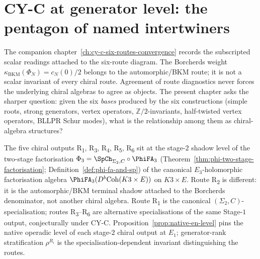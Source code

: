 \chapter{CY-C at generator level: the pentagon of named intertwiners}
\label{ch:cy-c-six-routes-generator-level}

\providecommand{\CoHA}{\mathrm{CoHA}}
\providecommand{\Coh}{\mathrm{Coh}}
\providecommand{\HH}{\mathrm{HH}}
\providecommand{\Sym}{\mathrm{Sym}}
\providecommand{\Hilb}{\mathrm{Hilb}}
\providecommand{\Eone}{E_{1}}
\providecommand{\gbkm}{\mathfrak{g}_{\Delta_5}}
\providecommand{\kch}{\kappa_{\mathrm{ch}}}
\providecommand{\kcat}{\kappa_{\mathrm{cat}}}
\providecommand{\kbkm}{\kappa_{\mathrm{BKM}}}
\providecommand{\rhoR}{\rho}
\providecommand{\LMuk}{\Lambda_{\mathrm{Muk}}}

The companion chapter~\ref{ch:cy-c-six-routes-convergence} records the
subscripted scalar readings attached to the six-route diagram. The
Borcherds weight $\kbkm(\Phi_N) = c_N(0)/2$ belongs to the automorphic/BKM route;
it is not a scalar invariant of every chiral route. Agreement of
route diagnostics never forces the underlying chiral algebras to agree as
objects. The present chapter asks the
sharper question: given the six \emph{bases} produced by the six constructions (simple roots,
strong generators, vertex operators, $\mathbb{Z}/2$-invariants, half-twisted vertex operators, BLLPR
Schur modes), what is the relationship among them as chiral-algebra structures?

The five chiral outputs R\textsubscript{1}, R\textsubscript{3}, R\textsubscript{4}, R\textsubscript{5}, R\textsubscript{6} sit at the stage-$2$ shadow level of the two-stage factorisation $\Phi_3 = \SpCh_{\Sigma_2, C} \circ \PhiFA_3$ (Theorem~\ref{thm:phi-two-stage-factorisation}; Definition~\ref{def:phi-fa-and-sp}) of the canonical $E_3$-holomorphic factorisation algebra $\PhiFA_3(D^b\Coh(K3 \times E))$ on $K3 \times E$. Route R\textsubscript{2} is different: it is the automorphic/BKM terminal shadow attached to the Borcherds denominator, not another chiral algebra. Route R\textsubscript{1} is the canonical $(\Sigma_2, C)$-specialisation; routes R\textsubscript{3}--R\textsubscript{6} are alternative specialisations of the same Stage-$1$ output, conjecturally under CY-C. Proposition~\ref{prop:native-en-level} pins the native operadic level of each stage-$2$ chiral output at $\Eone$; generator-rank stratification $\rhoR^{R_i}$ is the specialisation-dependent invariant distinguishing the routes.

